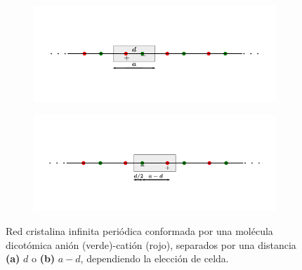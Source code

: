 \begin{figure}[h!]
    \centering
   \captionsetup[sub]{font=small}
    \begin{minipage}[h!]{1\textwidth}
        \begin{subfigure}[b!]{1 \textwidth}
            \caption{}
            \vspace*{-2em}
            \includegraphics[width=\textwidth]{Imagenes/Models/polarizatio_example_a.pdf}
        \end{subfigure}\hspace*{-0.5em}
    \end{minipage}\vspace*{-2.5em}

    \begin{minipage}[h!]{1\textwidth}
        \begin{subfigure}[b!]{1 \textwidth}
            \caption{}
            \vspace*{-2em}
            \includegraphics[width=\textwidth]{Imagenes/Models/polarizatio_example_b.pdf}
        \end{subfigure}\hspace*{-0.5em}
    \end{minipage}\vspace*{-1.5em}
    
    \caption{Red cristalina infinita periódica conformada por una molécula dicotómica anión (verde)-catión (rojo), separados por una distancia \textbf{(a)} $d$ o \textbf{(b)} $a-d$, dependiendo la elección de celda.}
    \label{fig:Model_polarization}
\end{figure}